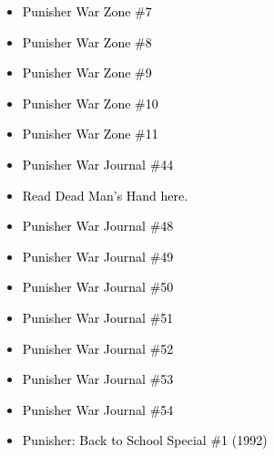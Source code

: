 \documentclass[12pt]{article}
\newcommand{\checkbox}{\raisebox{0.0ex}{\fbox{\rule{0ex}{1.5ex} \rule{1.5ex}{0ex}}}}
\begin{document}
\vspace{0.3cm}
\noindent
\begin{tcolorbox}[
  colback=white!95!gray,
  colframe=black,
  width=\textwidth,
  arc=4mm,
  auto outer arc,
  boxrule=0.8pt,
  left=8pt,right=8pt,top=8pt,bottom=8pt
]
\begin{itemize}[left=0pt,label={\checkbox}]
    \item \textcolor{black}{Punisher War Zone \#7}
    \item \textcolor{black}{Punisher War Zone \#8}
    \item \textcolor{black}{Punisher War Zone \#9}
    \item \textcolor{black}{Punisher War Zone \#10}
    \item \textcolor{black}{Punisher War Zone \#11}
    \item \textcolor{black}{Punisher War Journal \#44}
    \item \textcolor{black}{Read Dead Man’s Hand here.}
    \item \textcolor{black}{Punisher War Journal \#48}
    \item \textcolor{black}{Punisher War Journal \#49}
    \item \textcolor{black}{Punisher War Journal \#50}
    \item \textcolor{black}{Punisher War Journal \#51}
    \item \textcolor{black}{Punisher War Journal \#52}
    \item \textcolor{black}{Punisher War Journal \#53}
    \item \textcolor{black}{Punisher War Journal \#54}
    \item \textcolor{black}{Punisher: Back to School Special \#1 (1992)}
\end{itemize}
\end{tcolorbox}

\newpage
{}
\end{document}
